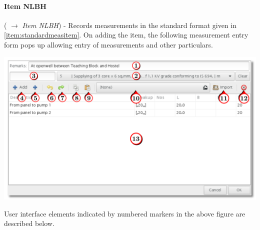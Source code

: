 \documentclass[twoside,a4paper]{refart}
\begin{document}
	 \paragraph{Item NLBH} \label{item:measitemnlbh} (\fbox{\emph{$+$}} $\rightarrow$ \emph{Item NLBH}) - Records measurements in the standard format given in \ref{item:standardmeasitem}. On adding the item, the following measurement entry form pops up allowing entry of measurements and other particulars.
	 
	 \begin{maxipage}
	 	\includegraphics[width=1\linewidth]{screenshots/window_nlbh.png}
	 \end{maxipage}
	 
	 User interface elements indicated by numbered markers in the above figure are described below.
	 
\end{document}
